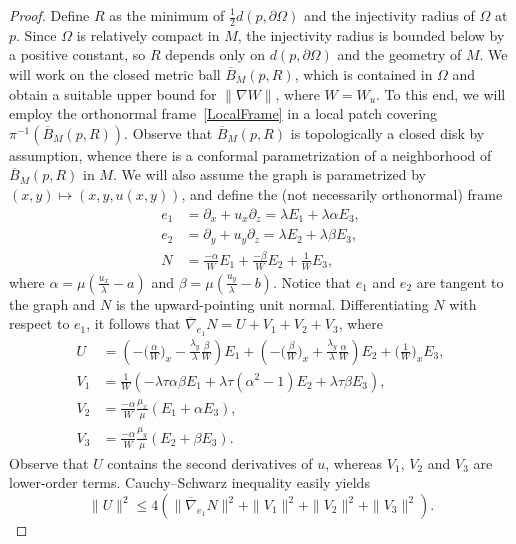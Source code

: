 \documentclass[a4paper,10pt,reqno]{amsart}
\theoremstyle{definition}
\theoremstyle{remark}
\numberwithin{equation}{section}
\begin{document}
\begin{proof}
Define $R$ as the minimum of $\frac{1}{2}d(p,\partial\Omega)$ and the injectivity radius of $\Omega$ at $p$. Since $\Omega$ is relatively compact in $M$, the injectivity radius is bounded below by a positive constant, so $R$ depends only on $d(p,\partial\Omega)$ and the geometry of $M$. We will work on the closed metric ball $\overline B_M(p,R)$, which is contained in $\Omega$ and obtain a suitable upper bound for $\|\nabla W\|$, where $W=W_u$. To this end, we will employ the orthonormal frame~\eqref{LocalFrame} in a local patch covering $\pi^{-1}(\overline B_M(p,R))$. Observe that $\overline B_M(p,R)$ is topologically a closed disk by assumption, whence there is a conformal parametrization of a neighborhood of $\overline B_M(p,R)$ in $M$. We will also assume the graph is parametrized by $(x,y)\mapsto(x,y,u(x,y))$, and define the (not necessarily orthonormal) frame 
	\begin{align*}
			e_1&=\partial_x+u_x\partial_z=\lambda E_1+\lambda \alpha E_3,\\
			e_2&=\partial_y+u_y\partial_z=\lambda E_2+\lambda \beta E_3,\\
			N&=\tfrac{-\alpha}{W}E_1+\tfrac{-\beta}{W}E_2+\tfrac{1}{W}E_3,
	\end{align*}
where $\alpha=\mu\left(\frac{u_x}{\lambda}-a\right)$ and $\beta=\mu\left(\frac{u_y}{\lambda}-b\right)$. Notice that $e_1$ and $e_2$ are tangent to the graph and $N$ is the upward-pointing unit normal. Differentiating $N$ with respect to $e_1$, it follows that $\overline\nabla_{e_1}N=U+V_1+V_2+V_3$, where
\begin{align*}
	U&=\left(-\bigl(\tfrac{\alpha}{W}\bigr)_x-\tfrac{\lambda_y}{\lambda}\tfrac{\beta}{W}\right)E_1+\left(-\bigl(\tfrac{\beta}{W}\bigl)_x+\tfrac{\lambda_y}{\lambda}\tfrac{\alpha}{W}\right)E_2+\bigl(\tfrac{1}{W}\bigr)_xE_3,\\
	V_1&=\tfrac{1}{W}\left(-\lambda\tau\alpha\beta E_1+\lambda\tau(\alpha^2-1)E_2+\lambda\tau\beta E_3\right),\\
	V_2&=\tfrac{-\alpha}{W}\tfrac{\mu_x}{\mu}\left(E_1+\alpha E_3\right),\\
	V_3&=\tfrac{-\alpha}{W}\tfrac{\mu_y}{\mu}\left(E_2+\beta E_3\right).
\end{align*}
Observe that $U$ contains the second derivatives of $u$, whereas $V_1$, $V_2$ and $V_3$ are lower-order terms. Cauchy--Schwarz inequality easily yields
\begin{equation}\label{thm:harnack:eqn1}
\|U\|^2\leq4\left(\|\overline{\nabla}_{e_1}N\|^2+\|V_1\|^2+\|V_2\|^2+\|V_3\|^2\right).

\end{equation}
\end{proof}
\end{document}

